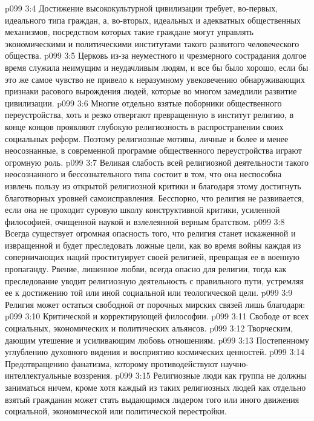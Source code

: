 \vs p099 3:4 \pc Достижение высококультурной цивилизации требует, во\hyp{}первых, идеального типа граждан, а, во\hyp{}вторых, идеальных и адекватных общественных механизмов, посредством которых такие граждане могут управлять экономическими и политическими институтами такого развитого человеческого общества.
\vs p099 3:5 Церковь из\hyp{}за неуместного и чрезмерного сострадания долгое время служила неимущим и неудачливым людям, и все бы было хорошо, если бы это же самое чувство не привело к неразумному увековечению обнаруживающих признаки расового вырождения людей, которые во многом замедлили развитие цивилизации.
\vs p099 3:6 Многие отдельно взятые поборники общественного переустройства, хоть и резко отвергают превращенную в институт религию, в конце концов проявляют глубокую религиозность в распространении своих социальных реформ. Поэтому религиозные мотивы, личные и более и менее неосознанные, в современной программе общественного переустройства играют огромную роль.
\vs p099 3:7 \pc Великая слабость всей религиозной деятельности такого неосознанного и бессознательного типа состоит в том, что она неспособна извлечь пользу из открытой религиозной критики и благодаря этому достигнуть благотворных уровней самоисправления. Бесспорно, что религия не развивается, если она не проходит суровую школу конструктивной критики, усиленной философией, очищенной наукой и взлелеянной верным братством.
\vs p099 3:8 Всегда существует огромная опасность того, что религия станет искаженной и извращенной и будет преследовать ложные цели, как во время войны каждая из соперничающих наций проституирует своей религией, превращая ее в военную пропаганду. Рвение, лишенное любви, всегда опасно для религии, тогда как преследование уводит религиозную деятельность с правильного пути, устремляя ее к достижению той или иной социальной или теологической цели.
\vs p099 3:9 \pc Религия может остаться свободной от порочных мирских связей лишь благодаря:
\vs p099 3:10 \bibnobreakspace Критической и корректирующей философии.
\vs p099 3:11 \bibnobreakspace Свободе от всех социальных, экономических и политических альянсов.
\vs p099 3:12 \bibnobreakspace Творческим, дающим утешение и усиливающим любовь отношениям.
\vs p099 3:13 \bibnobreakspace Постепенному углублению духовного видения и восприятию космических ценностей.
\vs p099 3:14 \bibnobreakspace Предотвращению фанатизма, которому противодействуют научно\hyp{}интеллектуальные воззрения.
\vs p099 3:15 \pc Религиозные люди как группа не должны заниматься ничем, кроме  хотя каждый из таких религиозных людей как отдельно взятый гражданин может стать выдающимся лидером того или иного движения социальной, экономической или политической перестройки.
